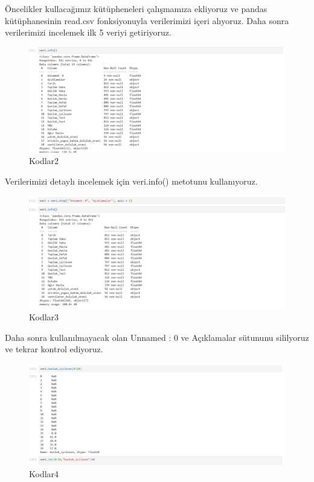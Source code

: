 \documentclass[12pt, a4paper]{article}
\begin{document}
Öncelikler kullacağımız kütüpheneleri çalışmamıza ekliyoruz ve pandas kütüphanesinin read.csv fonksiyonuyla verilerimizi içeri alıyoruz.\newline
Daha sonra verilerimizi incelemek ilk 5 veriyi getiriyoruz.

\begin{figure}[!htbp] 
	\caption{Kodlar2}
	\centering
	\includegraphics[angle=0, width=\textwidth]{6.0.png} 
	
\end{figure} 
\newpage
Verilerimizi detaylı incelemek için veri.info() metotunu kullanıyoruz.

\begin{figure}[!htbp] 
	\caption{Kodlar3}
	\centering
	\includegraphics[angle=0, width=\textwidth]{7.0.png} 
	
\end{figure}
Daha sonra kullanılmayacak olan Unnamed : 0 ve Açıklamalar sütununu sililyoruz ve tekrar kontrol ediyoruz.

\begin{figure}[!htbp] 
	\caption{Kodlar4}
	\centering
	\includegraphics[angle=0, width=\textwidth]{8.0.png} 
	
\end{figure}
\end{document}
